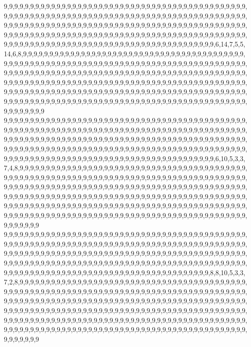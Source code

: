 9,9,9,9,9,9,9,9,9,9,9,9,9,9,9,9,9,9,9,9,9,9,9,9,9,9,9,9,9,9,9,9,9,9,9,9,9,9,9,9,9,9,9,9,9,9,9,9,9,9,9,9,9,9,9,9,9,9,9,9,9,9,9,9,9,9,9,9,9,9,9,9,9,9,9,9,9,9,9,9,9,9,9,9,9,9,9,9,9,9,9,9,9,9,9,9,9,9,9,9,9,9,9,9,9,9,9,9,9,9,9,9,9,9,9,9,9,9,9,9,9,9,9,9,9,9,9,9,9,9,9,9,9,9,9,9,9,9,9,9,9,9,9,9,9,9,9,9,9,9,9,9,9,9,9,9,9,9,9,9,9,9,9,9,9,9,9,9,9,9,9,9,9,9,9,9,9,9,9,9,9,9,9,9,9,9,9,9,9,9,9,9,9,9,9,9,9,9,9,9,9,9,9,9,9,9,9,9,9,9,9,9,9,9,9,9,9,9,9,9,9,9,9,9,6,14,7,5,5,14,6,8,9,9,9,9,9,9,9,9,9,9,9,9,9,9,9,9,9,9,9,9,9,9,9,9,9,9,9,9,9,9,9,9,9,9,9,9,9,9,9,9,9,9,9,9,9,9,9,9,9,9,9,9,9,9,9,9,9,9,9,9,9,9,9,9,9,9,9,9,9,9,9,9,9,9,9,9,9,9,9,9,9,9,9,9,9,9,9,9,9,9,9,9,9,9,9,9,9,9,9,9,9,9,9,9,9,9,9,9,9,9,9,9,9,9,9,9,9,9,9,9,9,9,9,9,9,9,9,9,9,9,9,9,9,9,9,9,9,9,9,9,9,9,9,9,9,9,9,9,9,9,9,9,9,9,9,9,9,9,9,9,9,9,9,9,9,9,9,9,9,9,9,9,9,9,9,9,9,9,9,9,9,9,9,9,9,9,9,9,9,9,9,9,9,9,9,9,9,9,9,9,9,9,9,9,9,9,9,9,9,9,9,9,9,9,9,9,9,9,9,9,9,9,9,9,9,9,9,9,9,9,9,9,9,9,9,9,9,9,9,9,9,9,9,9,9,9,9,9,9,9,9,9,9,9,9,9,9,9,9,9,9,9,9,9,9,9,9,9,9,9,9,9,9,9,9,9,9,9,9,9
9,9,9,9,9,9,9,9,9,9,9,9,9,9,9,9,9,9,9,9,9,9,9,9,9,9,9,9,9,9,9,9,9,9,9,9,9,9,9,9,9,9,9,9,9,9,9,9,9,9,9,9,9,9,9,9,9,9,9,9,9,9,9,9,9,9,9,9,9,9,9,9,9,9,9,9,9,9,9,9,9,9,9,9,9,9,9,9,9,9,9,9,9,9,9,9,9,9,9,9,9,9,9,9,9,9,9,9,9,9,9,9,9,9,9,9,9,9,9,9,9,9,9,9,9,9,9,9,9,9,9,9,9,9,9,9,9,9,9,9,9,9,9,9,9,9,9,9,9,9,9,9,9,9,9,9,9,9,9,9,9,9,9,9,9,9,9,9,9,9,9,9,9,9,9,9,9,9,9,9,9,9,9,9,9,9,9,9,9,9,9,9,9,9,9,9,9,9,9,9,9,9,9,9,9,9,9,9,9,9,9,9,9,9,9,9,9,9,9,9,9,9,9,9,6,10,5,3,3,7,4,8,9,9,9,9,9,9,9,9,9,9,9,9,9,9,9,9,9,9,9,9,9,9,9,9,9,9,9,9,9,9,9,9,9,9,9,9,9,9,9,9,9,9,9,9,9,9,9,9,9,9,9,9,9,9,9,9,9,9,9,9,9,9,9,9,9,9,9,9,9,9,9,9,9,9,9,9,9,9,9,9,9,9,9,9,9,9,9,9,9,9,9,9,9,9,9,9,9,9,9,9,9,9,9,9,9,9,9,9,9,9,9,9,9,9,9,9,9,9,9,9,9,9,9,9,9,9,9,9,9,9,9,9,9,9,9,9,9,9,9,9,9,9,9,9,9,9,9,9,9,9,9,9,9,9,9,9,9,9,9,9,9,9,9,9,9,9,9,9,9,9,9,9,9,9,9,9,9,9,9,9,9,9,9,9,9,9,9,9,9,9,9,9,9,9,9,9,9,9,9,9,9,9,9,9,9,9,9,9,9,9,9,9,9,9,9,9,9,9,9,9,9,9,9,9,9,9,9,9,9,9,9,9,9,9,9,9,9,9,9,9,9,9,9,9,9,9,9,9,9,9,9,9,9,9,9,9,9,9,9,9,9,9,9,9,9,9,9,9,9,9,9,9,9,9,9,9,9,9,9,9
9,9,9,9,9,9,9,9,9,9,9,9,9,9,9,9,9,9,9,9,9,9,9,9,9,9,9,9,9,9,9,9,9,9,9,9,9,9,9,9,9,9,9,9,9,9,9,9,9,9,9,9,9,9,9,9,9,9,9,9,9,9,9,9,9,9,9,9,9,9,9,9,9,9,9,9,9,9,9,9,9,9,9,9,9,9,9,9,9,9,9,9,9,9,9,9,9,9,9,9,9,9,9,9,9,9,9,9,9,9,9,9,9,9,9,9,9,9,9,9,9,9,9,9,9,9,9,9,9,9,9,9,9,9,9,9,9,9,9,9,9,9,9,9,9,9,9,9,9,9,9,9,9,9,9,9,9,9,9,9,9,9,9,9,9,9,9,9,9,9,9,9,9,9,9,9,9,9,9,9,9,9,9,9,9,9,9,9,9,9,9,9,9,9,9,9,9,9,9,9,9,9,9,9,9,9,9,9,9,9,9,9,9,9,9,9,9,9,9,9,9,9,9,8,8,10,5,3,3,7,2,8,9,9,9,9,9,9,9,9,9,9,9,9,9,9,9,9,9,9,9,9,9,9,9,9,9,9,9,9,9,9,9,9,9,9,9,9,9,9,9,9,9,9,9,9,9,9,9,9,9,9,9,9,9,9,9,9,9,9,9,9,9,9,9,9,9,9,9,9,9,9,9,9,9,9,9,9,9,9,9,9,9,9,9,9,9,9,9,9,9,9,9,9,9,9,9,9,9,9,9,9,9,9,9,9,9,9,9,9,9,9,9,9,9,9,9,9,9,9,9,9,9,9,9,9,9,9,9,9,9,9,9,9,9,9,9,9,9,9,9,9,9,9,9,9,9,9,9,9,9,9,9,9,9,9,9,9,9,9,9,9,9,9,9,9,9,9,9,9,9,9,9,9,9,9,9,9,9,9,9,9,9,9,9,9,9,9,9,9,9,9,9,9,9,9,9,9,9,9,9,9,9,9,9,9,9,9,9,9,9,9,9,9,9,9,9,9,9,9,9,9,9,9,9,9,9,9,9,9,9,9,9,9,9,9,9,9,9,9,9,9,9,9,9,9,9,9,9,9,9,9,9,9,9,9,9,9,9,9,9,9,9,9,9,9,9,9,9,9,9,9,9,9,9,9,9,9,9,9,9,9
